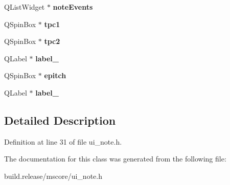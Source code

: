 \begin{DoxyCompactItemize}
Q\+List\+Widget $\ast$ {\bfseries note\+Events}
\item 
\mbox{\label{class_ui___note_base_a9ff0d6c230bec7f51d7b30f4333e4d9b}} 
Q\+Spin\+Box $\ast$ {\bfseries tpc1}
\item 
\mbox{\label{class_ui___note_base_a39e1ee390dbfb2a9de2e3c8446c26346}} 
Q\+Spin\+Box $\ast$ {\bfseries tpc2}
\item 
\mbox{\label{class_ui___note_base_a406aa51c31e2e3418aeb4c3613fc02a6}} 
Q\+Label $\ast$ {\bfseries label\+\_}
\item 
\mbox{\label{class_ui___note_base_a235150b67de1404db437421caeb657a7}} 
Q\+Spin\+Box $\ast$ {\bfseries epitch}
\item 
\mbox{\label{class_ui___note_base_a0940d649d1c763e094465fcc6dad8c1d}} 
Q\+Label $\ast$ {\bfseries label\+\_}
\end{DoxyCompactItemize}


\subsection{Detailed Description}


Definition at line 31 of file ui\+\_\+note.\+h.



The documentation for this class was generated from the following file\+:\begin{DoxyCompactItemize}
\item 
build.\+release/mscore/ui\+\_\+note.\+h\end{DoxyCompactItemize}
